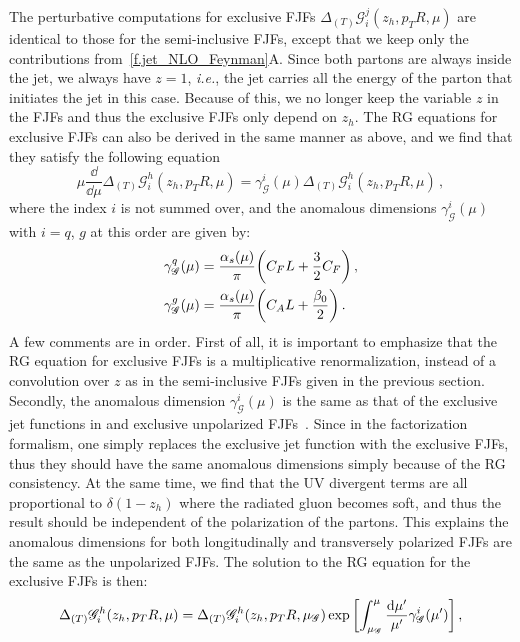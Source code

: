 \documentclass[a4paper, 11 pt]{article}
\begin{document}
The perturbative computations for exclusive FJFs $\Delta_{(T)}\mathscr{G}_i^j(z_h, p_TR, \mu)$ are identical to those for the semi-inclusive FJFs, except that we keep only the contributions from~\cref{f.jet_NLO_Feynman}A. Since both partons are always inside the jet, we always have $z=1$, \textit{i.e.}, the jet carries all the energy of the parton that initiates the jet in this case. Because of this, we no longer keep the variable $z$ in the FJFs and thus the exclusive FJFs only depend on $z_h$. The RG equations for exclusive FJFs can also be derived in the same manner as above, and we find that they satisfy the following equation 
\begin{equation}
\mu \frac{\dd{}}{\dd{\mu}} \Delta _{(T)} \mathscr{G}_i^h(z_h, p_TR, \mu)
=
\gamma _{\mathscr{G}}^i(\mu) \Delta _{(T)} \mathscr{G}_i^h (z_h, p_TR, \mu)
\, ,
\end{equation}
where the index $i$ is not summed over, and the anomalous dimensions $\gamma _{\mathscr{G}}^i(\mu)$ with $i=q$, $g$ at this order are given by:
\begin{align}
\gamma_{\mathscr{G}}^q (\mu)
& =
\frac{\alpha_s (\mu)}{\pi}
\pqty{C_F L + \frac{3}{2}C_F}
\, , \\
\gamma_{\mathscr{G}}^g (\mu)
& =
\frac{\alpha_s (\mu)}{\pi}
\pqty{C_A L + \frac{\beta_0}{2}}
\, .
\end{align}
A few comments are in order.
First of all, it is important to emphasize that the RG equation for exclusive FJFs is a multiplicative renormalization, instead of a convolution over $z$ as in the semi-inclusive FJFs given in the previous section.
Secondly, the anomalous dimension $\gamma _{\mathscr{G}}^i(\mu)$ is the same as that of the exclusive jet functions in \cite{Ellis:2010rwa} and exclusive unpolarized FJFs~\cite{Kang:2019ahe,Chien:2015ctp,Waalewijn:2012sv}.
Since in the factorization formalism, one simply replaces the exclusive jet function with the exclusive FJFs, thus they should have the same anomalous dimensions simply because of the RG consistency.
At the same time, we find that the UV divergent terms are all proportional to $\delta(1-z_h)$ where the radiated gluon becomes soft, and thus the result should be independent of the polarization of the partons.
This explains the anomalous dimensions for both longitudinally and transversely polarized FJFs are the same as the unpolarized FJFs. 
The solution to the RG equation for the exclusive FJFs is then:
\begin{equation}
\Delta_{(T)}\mathscr{G}_i^h (z_h, p_TR, \mu)
=
\Delta_{(T)}\mathscr{G}_i^h \pqty{z_h, p_TR, \mu_{\mathscr{G}}} \exp \bqty{\int_{\mu_{\mathscr{G}}}^\mu \frac{\dd{\mu^{\prime}}}{\mu^{\prime}} \gamma_{\mathscr{G}}^i\pqty{\mu^{\prime}}}
\, , \label{eq:exclu-rg}
\end{equation}
\end{document}
